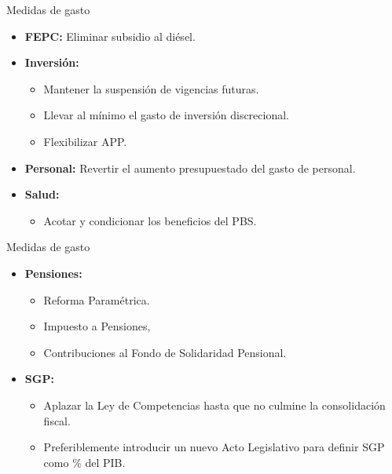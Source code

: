 \begin{frame}{Medidas de gasto}
    \begin{itemize}
        \item \textbf{FEPC: } Eliminar subsidio al diésel.
        \item \textbf{Inversión:} 
        \begin{itemize}
            \item Mantener la suspensión de vigencias futuras.
            \item Llevar al mínimo el gasto de inversión discrecional.
            \item Flexibilizar APP.
        \end{itemize} 
        \item \textbf{Personal:} Revertir el aumento presupuestado del gasto de personal.
        \item \textbf{Salud:} 
        \begin{itemize}
            \item Acotar y condicionar los beneficios del PBS. 
        \end{itemize} 
    \end{itemize}
\end{frame}

\begin{frame}{Medidas de gasto}
    \begin{itemize}
            \item \textbf{Pensiones:} 
            \begin{itemize}
                \item Reforma Paramétrica. 
                \item Impuesto a Pensiones, \item Contribuciones al Fondo de Solidaridad Pensional.
            \end{itemize}  
        \item \textbf{SGP:} 
        \begin{itemize}
            \item Aplazar la Ley de Competencias hasta que no culmine la consolidación fiscal.
            \item Preferiblemente introducir un nuevo Acto Legislativo para definir SGP como \% del PIB.
        \end{itemize}    
    \end{itemize}
\end{frame}

